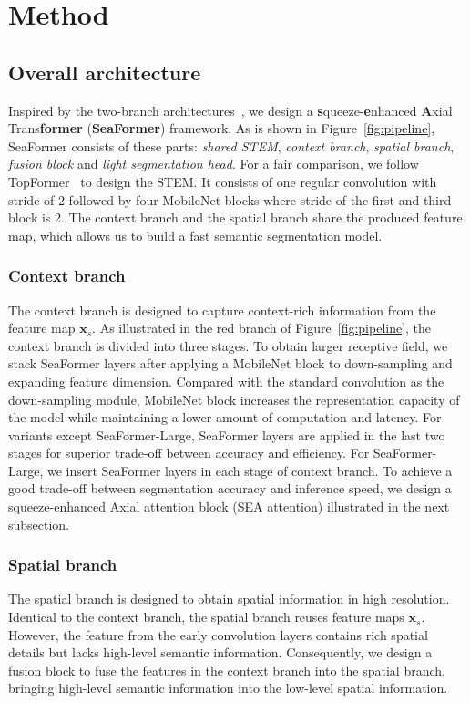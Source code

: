 \section{Method}
\label{Met}
\subsection{Overall architecture}
\label{sec:method}
Inspired by the two-branch architectures~\cite{yu2021bisenet, poudel2019fast, hong2021deep,huang2021alignseg,chen2022mobile}, we design a {\bf s}queeze-{\bf e}nhanced {\bf A}xial Trans{\bf former} ({\bf SeaFormer}) framework. 
As is shown in Figure~\ref{fig:pipeline}, SeaFormer consists of these parts: \textit{shared STEM}, \textit{context branch}, \textit{spatial branch}, \textit{fusion block} and \textit{light segmentation head}.
For a fair comparison, we follow TopFormer~\cite{zhang2022topformer} to design the STEM. 
It consists of one regular convolution with stride of 2 followed by four MobileNet blocks where stride of the first and third block is 2.
The context branch and the spatial branch share the produced feature map,  which allows us to build a fast semantic segmentation model.

\subsubsection{Context branch}
The context branch is designed to capture context-rich information from the feature map $\mathbf{x}_s$.
As illustrated in the red branch of Figure~\ref{fig:pipeline}, the context branch is divided into three stages.
To obtain larger receptive field, we stack SeaFormer layers after applying a MobileNet block to down-sampling and expanding feature dimension. 
Compared with the standard convolution as the down-sampling module, MobileNet block increases the representation capacity of the model while maintaining a lower amount of computation and latency.
For variants except SeaFormer-Large, SeaFormer layers are applied in the last two stages for superior trade-off between accuracy and efficiency. 
For SeaFormer-Large, we insert SeaFormer layers in each stage of context branch.
To achieve a good trade-off between segmentation accuracy and inference speed, we design a squeeze-enhanced Axial attention block (SEA attention) illustrated in the next subsection.


\subsubsection{Spatial branch}
The spatial branch is designed to obtain spatial information in high resolution. 
Identical to the context branch, the spatial branch reuses feature maps $\mathbf{x}_s$. 
However, the feature from the early convolution layers contains rich spatial details but lacks high-level semantic information. 
Consequently, we design a fusion block to fuse the features in the context branch into the spatial branch, bringing high-level semantic information into the low-level spatial information.

